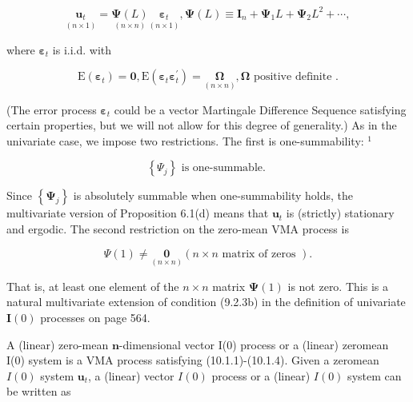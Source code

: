 \documentclass[10pt]{article}
\begin{document}
\begin{equation*}
\underset{(n \times 1)}{\mathbf{u}_{t}}=\underset{(n \times n)}{\boldsymbol{\Psi}(L)} \underset{(n \times 1)}{\boldsymbol{\varepsilon}_{t}}, \boldsymbol{\Psi}(L) \equiv \mathbf{I}_{n}+\boldsymbol{\Psi}_{1} L+\boldsymbol{\Psi}_{2} L^{2}+\cdots, \tag{10.1.1}
\end{equation*}


where $\boldsymbol{\varepsilon}_{t}$ is i.i.d. with


\begin{equation*}
\mathrm{E}\left(\boldsymbol{\varepsilon}_{t}\right)=\mathbf{0}, \mathrm{E}\left(\boldsymbol{\varepsilon}_{t} \boldsymbol{\varepsilon}_{t}^{\prime}\right)=\underset{(n \times n)}{\boldsymbol{\Omega}}, \boldsymbol{\Omega} \text { positive definite } . \tag{10.1.2}
\end{equation*}


(The error process $\boldsymbol{\varepsilon}_{t}$ could be a vector Martingale Difference Sequence satisfying certain properties, but we will not allow for this degree of generality.) As in the univariate case, we impose two restrictions. The first is one-summability: ${ }^{1}$


\begin{equation*}
\left\{\Psi_{j}\right\} \text { is one-summable. } \tag{10.1.3}
\end{equation*}


Since $\left\{\boldsymbol{\Psi}_{j}\right\}$ is absolutely summable when one-summability holds, the multivariate version of Proposition 6.1(d) means that $\mathbf{u}_{t}$ is (strictly) stationary and ergodic. The second restriction on the zero-mean VMA process is


\begin{equation*}
\Psi(1) \neq \underset{(n \times n)}{\mathbf{0}}(n \times n \text { matrix of zeros }) . \tag{10.1.4}
\end{equation*}


That is, at least one element of the $n \times n$ matrix $\boldsymbol{\Psi}(1)$ is not zero. This is a natural multivariate extension of condition (9.2.3b) in the definition of univariate $\mathbf{I}(0)$ processes on page 564.

A (linear) zero-mean $\boldsymbol{n}$-dimensional vector I(0) process or a (linear) zeromean I(0) system is a VMA process satisfying (10.1.1)-(10.1.4). Given a zeromean $I(0)$ system $\mathbf{u}_{t}$, a (linear) vector $I(0)$ process or a (linear) $I(0)$ system can be written as
\end{document}
